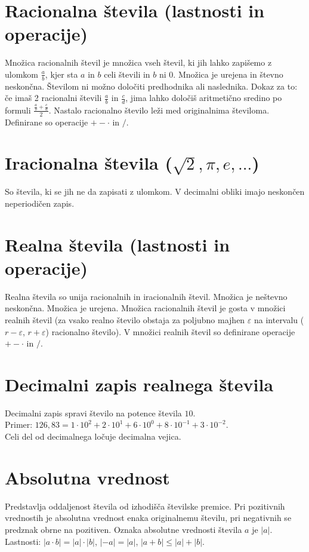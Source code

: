 \documentclass[12pt]{report}
\begin{document}
\section*{Racionalna števila (lastnosti in operacije)}
Množica racionalnih števil je množica vseh števil, ki jih lahko zapišemo z ulomkom $\frac{a}{b}$, kjer sta $a$ in $b$ celi števili in $b$ ni $0$. Množica je urejena in števno neskončna. Številom ni možno določiti predhodnika ali naslednika. Dokaz za to: če imaš 2 racionalni števili $\frac{a}{b}$ in $\frac{c}{d}$, jima lahko določiš aritmetično sredino po formuli $\frac{\frac{a}{b}+\frac{c}{d}}{2}$. Nastalo racionalno število leži med originalnima številoma. Definirane so operacije $+ - \cdot$ in $/$. 


\section*{Iracionalna števila ($\sqrt{2},\pi,e, ...$)}
So števila, ki se jih ne da zapisati z ulomkom. V decimalni obliki imajo neskončen neperiodičen zapis.

\section*{Realna števila (lastnosti in operacije)}
Realna števila so unija racionalnih in iracionalnih števil. Množica je neštevno neskončna. Množica je urejena. Množica racionalnih števil je gosta v množici realnih števil (za vsako realno število obstaja za poljubno majhen $\varepsilon$ na intervalu ($r-\varepsilon$, $r+\varepsilon$) racionalno število). V množici realnih števil so definirane operacije $+ - \cdot$ in $/$.

\section*{Decimalni zapis realnega števila}
Decimalni zapis spravi število na potence števila $10$.\\ 
Primer: $126,83 = 1 \cdot 10^{2} + 2 \cdot 10^{1} + 6 \cdot 10^{0} + 8 \cdot 10^{-1} + 3 \cdot 10^{-2}$. \\
Celi del od decimalnega ločuje decimalna vejica.

\section*{Absolutna vrednost}
Predstavlja oddaljenost števila od izhodišča številske premice. Pri pozitivnih vrednostih je absolutna vrednost enaka originalnemu številu, pri negativnih se predznak obrne na pozitiven. Oznaka absolutne vrednosti števila $a$ je $|a|$. Lastnosti: $|a\cdot b|=|a|\cdot|b|$, $|-a|=|a|$, $|a+b| \leq |a|+|b|$.
\end{document}
